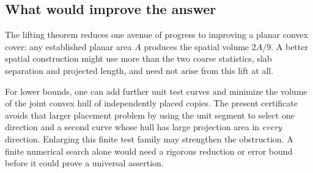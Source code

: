 \subsection{What would improve the answer}
The lifting theorem reduces one avenue of progress to improving a planar
convex cover: any established planar area $A$ produces the spatial
volume $2A/9$. A better spatial construction might use more than the
two coarse statistics, slab separation and projected length, and need
not arise from this lift at all.

For lower bounds, one can add further unit test curves and minimize the
volume of the joint convex hull of independently placed copies. The
present certificate avoids that larger placement problem by using the
unit segment to select one direction and a second curve whose hull has
large projection area in \emph{every} direction. Enlarging this finite
test family may strengthen the obstruction. A finite numerical search
alone would need a rigorous reduction or error bound before it could
prove a universal assertion.
